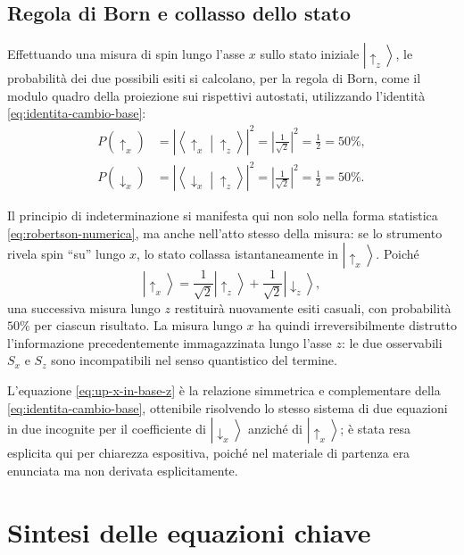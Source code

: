 \documentclass[11pt,a4paper]{article}
\newcommand{\ket}[1]{\left|#1\right\rangle}
\newcommand{\braket}[2]{\left\langle#1\middle|#2\right\rangle}
\begin{document}
\subsection{Regola di Born e collasso dello stato}

Effettuando una misura di spin lungo l'asse $x$ sullo stato iniziale $\ket{\uparrow_z}$, le probabilità dei due possibili esiti si calcolano, per la regola di Born, come il modulo quadro della proiezione sui rispettivi autostati, utilizzando l'identità \eqref{eq:identita-cambio-base}:
\begin{align}
P(\uparrow_x) &= \left|\braket{\uparrow_x}{\uparrow_z}\right|^2 = \left|\frac{1}{\sqrt2}\right|^2 = \frac12 = 50\%, \label{eq:born-up}\\
P(\downarrow_x) &= \left|\braket{\downarrow_x}{\uparrow_z}\right|^2 = \left|\frac{1}{\sqrt2}\right|^2 = \frac12 = 50\%. \label{eq:born-down}
\end{align}

Il principio di indeterminazione si manifesta qui non solo nella forma statistica \eqref{eq:robertson-numerica}, ma anche nell'atto stesso della misura: se lo strumento rivela spin ``su'' lungo $x$, lo stato collassa istantaneamente in $\ket{\uparrow_x}$. Poiché
\begin{equation}
\ket{\uparrow_x} = \frac{1}{\sqrt2}\ket{\uparrow_z}+\frac{1}{\sqrt2}\ket{\downarrow_z},
\label{eq:up-x-in-base-z}
\end{equation}
una successiva misura lungo $z$ restituirà nuovamente esiti casuali, con probabilità $50\%$ per ciascun risultato. La misura lungo $x$ ha quindi irreversibilmente distrutto l'informazione precedentemente immagazzinata lungo l'asse $z$: le due osservabili $S_x$ e $S_z$ sono incompatibili nel senso quantistico del termine.

\begin{nota}
L'equazione \eqref{eq:up-x-in-base-z} è la relazione simmetrica e complementare della \eqref{eq:identita-cambio-base}, ottenibile risolvendo lo stesso sistema di due equazioni in due incognite per il coefficiente di $\ket{\downarrow_x}$ anziché di $\ket{\uparrow_x}$; è stata resa esplicita qui per chiarezza espositiva, poiché nel materiale di partenza era enunciata ma non derivata esplicitamente.
\end{nota}

\section{Sintesi delle equazioni chiave}
\end{document}
